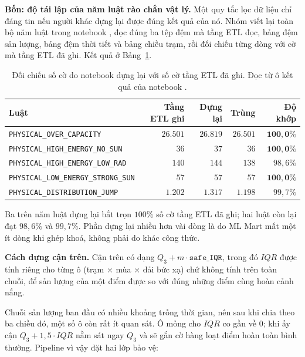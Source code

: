 \textbf{Bốn: độ tái lập của năm luật rào chắn vật lý.} Một quy tắc lọc dữ liệu chỉ đáng
tin nếu người khác dựng lại được đúng kết quả của nó. Nhóm viết lại toàn bộ năm luật trong
notebook , đọc đúng ba tệp đệm mà tầng ETL đọc, bảng
đệm sản lượng, bảng đệm thời tiết và bảng chiều trạm, rồi đối chiếu từng dòng với cờ mà
tầng ETL đã ghi. Kết quả ở Bảng~\ref{tab:tai_lap_luat}.

\begin{table}[htbp]
\centering

\small
\begin{tabular}{l r r r r}
\toprule
\textbf{Luật} & \textbf{Tầng ETL ghi} & \textbf{Dựng lại} & \textbf{Trùng} & \textbf{Độ khớp} \\
\midrule
\texttt{PHYSICAL\_OVER\_CAPACITY}          & $26.501$ & $26.819$ & $26.501$ & $\mathbf{100{,}0\%}$ \\
\texttt{PHYSICAL\_HIGH\_ENERGY\_NO\_SUN}   & $36$     & $37$     & $36$     & $\mathbf{100{,}0\%}$ \\
\texttt{PHYSICAL\_HIGH\_ENERGY\_LOW\_RAD}  & $140$    & $144$    & $138$    & $98{,}6\%$ \\
\texttt{PHYSICAL\_LOW\_ENERGY\_STRONG\_SUN}& $57$     & $57$     & $57$     & $\mathbf{100{,}0\%}$ \\
\texttt{PHYSICAL\_DISTRIBUTION\_JUMP}      & $1.202$  & $1.317$  & $1.198$  & $99{,}7\%$ \\
\bottomrule
\end{tabular}
\caption[Đối chiếu số cờ do notebook dựng lại với số cờ tầng ETL đã ghi]{Đối chiếu số cờ do notebook dựng lại với số cờ tầng ETL đã ghi. Đọc từ ô kết quả
của notebook .}
\label{tab:tai_lap_luat}
\end{table}

Ba trên năm luật dựng lại bắt trọn $100\%$ số cờ tầng ETL đã ghi; hai luật còn lại đạt
$98{,}6\%$ và $99{,}7\%$. Phần dựng lại nhiều hơn vài dòng là do ML Mart mất một ít dòng khi
ghép khoá, không phải do khác công thức.

\textbf{Cách dựng cận trên.} Cận trên có dạng $Q_3 + m \cdot \texttt{safe\_IQR}$, trong đó
$IQR$ được tính riêng cho từng ô (trạm $\times$ mùa $\times$ dải bức xạ) chứ không
tính trên toàn chuỗi, để sản lượng của một điểm được so với đúng những điểm cùng hoàn cảnh
nắng.

Chuỗi sản lượng ban đầu có nhiều khoảng trống thời gian, nên sau khi chia theo ba chiều đó,
một số ô còn rất ít quan sát. Ô mỏng cho $IQR$ co gần về $0$; khi ấy cận
$Q_3 + 1{,}5 \cdot IQR$ nằm sát ngay $Q_3$ và sẽ gắn cờ hàng loạt điểm hoàn toàn bình
thường. Pipeline vì vậy đặt hai lớp bảo vệ:

